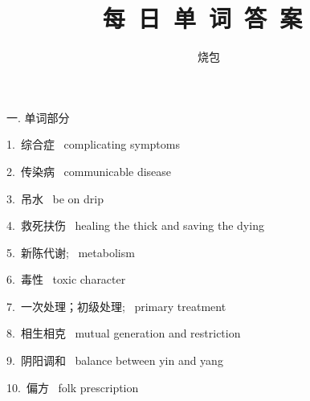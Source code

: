 \documentclass[a4paper, 12pt]{article}
\begin{document}
    \noindent

    \title{ 每\ 日\ 单\ 词\ 答\ 案\  }
    \author{ 烧包 }
    \maketitle

\begin{flushleft}
一. 单词部分
\end{flushleft}

\begin{multicols}{2}
\begin{flushleft}
1.\ 综合症 \ complicating symptoms
\end{flushleft}

\begin{flushleft}
2.\ 传染病 \ communicable disease
\end{flushleft}
\end{multicols}

\begin{multicols}{2}
\begin{flushleft}
3.\ 吊水 \ be on drip
\end{flushleft}

\begin{flushleft}
4.\ 救死扶伤 \ healing the thick and saving the dying
\end{flushleft}
\end{multicols}

\begin{multicols}{2}
\begin{flushleft}
5.\ 新陈代谢; \ metabolism
\end{flushleft}

\begin{flushleft}
6.\ 毒性 \ toxic character
\end{flushleft}
\end{multicols}

\begin{multicols}{2}
\begin{flushleft}
7.\ 一次处理；初级处理; \ primary treatment
\end{flushleft}

\begin{flushleft}
8.\ 相生相克 \ mutual generation and restriction
\end{flushleft}
\end{multicols}

\begin{multicols}{2}
\begin{flushleft}
9.\ 阴阳调和 \ balance between yin and yang 
\end{flushleft}

\begin{flushleft}
10.\ 偏方 \ folk prescription
\end{flushleft}
\end{multicols}
\end{document}

